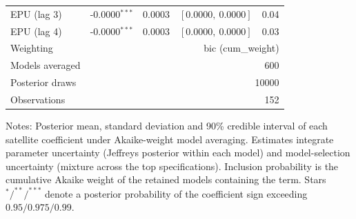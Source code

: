 \begin{table}[!htbp]
\begin{tabular}{lrrrr}
EPU (lag 3) & -0.0000$^{***}$ & 0.0003 & $[0.0000,\ 0.0000]$ & 0.04 \\
EPU (lag 4) & -0.0000$^{***}$ & 0.0003 & $[0.0000,\ 0.0000]$ & 0.03 \\
\midrule
Weighting & \multicolumn{4}{r}{bic (cum_weight)} \\
Models averaged & \multicolumn{4}{r}{600} \\
Posterior draws & \multicolumn{4}{r}{10000} \\
Observations & \multicolumn{4}{r}{152} \\
\bottomrule
\end{tabular}
\begin{tablenotes}\small
\item Notes: Posterior mean, standard deviation and 90\% credible interval of each satellite coefficient under Akaike-weight model averaging. Estimates integrate parameter uncertainty (Jeffreys posterior within each model) and model-selection uncertainty (mixture across the top specifications). Inclusion probability is the cumulative Akaike weight of the retained models containing the term. Stars $^{*}/^{**}/^{***}$ denote a posterior probability of the coefficient sign exceeding $0.95/0.975/0.99$.
\end{tablenotes}
\end{table}
